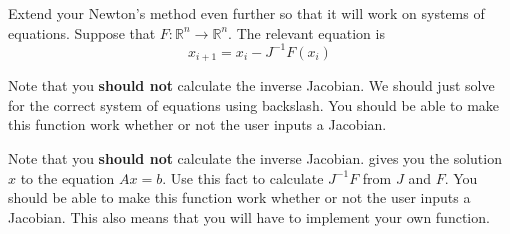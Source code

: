\begin{problem}
Extend your Newton's method even further so that it will work on systems of equations. Suppose that $F: \mathbb{R}^n \rightarrow \mathbb{R}^n $. The relevant equation is
\[
x_{i+1} = x_i - J^{-1}F(x_i)
\]
\begin{matlab}
 Note that you {\bf should not} calculate the inverse Jacobian. We should just solve for the correct system of equations using backslash. You should be able to make this function work whether or not the user inputs a Jacobian.
\end{matlab}
\begin{python}
Note that you {\bf should not} calculate the inverse Jacobian.  gives you the solution $x$ to the equation $Ax=b$. Use this fact to calculate $J^{-1}F$ from $J$ and $F$.  You should be able to make this function work whether or not the user inputs a Jacobian. This also means that you will have to implement your own  function.
\end{python}
\end{problem}

